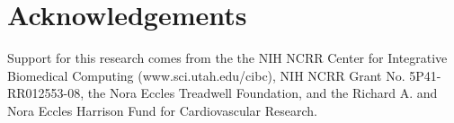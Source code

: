 %   

\section{Acknowledgements}
\label{sec:acknowl}

    Support for this research comes from the the NIH NCRR Center for
    Integrative Biomedical Computing (www.sci.utah.edu/cibc), NIH NCRR
    Grant No. 5P41-RR012553-08, the Nora Eccles Treadwell Foundation, and
    the Richard A. and Nora Eccles Harrison Fund for Cardiovascular
    Research.

